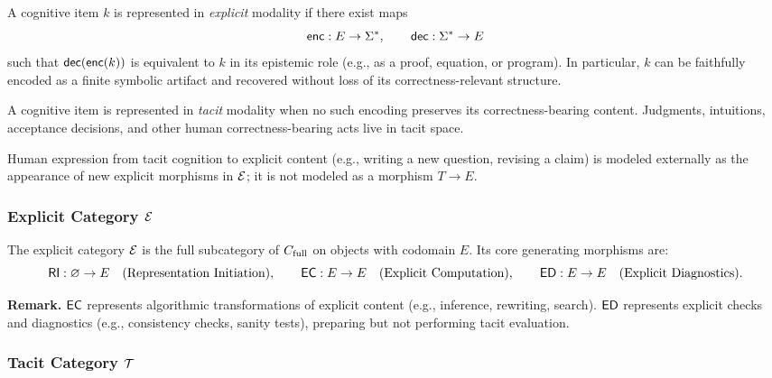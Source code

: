 \begin{definition}
A cognitive item \(k\) is represented in \emph{explicit} modality if there exist
maps
\[
\mathsf{enc} : E \to \Sigma^{\ast}, \qquad
\mathsf{dec} : \Sigma^{\ast} \to E
\]
such that \(\mathsf{dec}(\mathsf{enc}(k))\) is equivalent to \(k\) in its epistemic role
(e.g., as a proof, equation, or program). In particular, \(k\) can be
faithfully encoded as a finite symbolic artifact and recovered without
loss of its correctness-relevant structure.
\end{definition}

\begin{definition}
A cognitive item is represented in \emph{tacit} modality when no such
encoding preserves its correctness-bearing content. Judgments, intuitions,
acceptance decisions, and other human correctness-bearing acts live in
tacit space.
\end{definition}

Human expression from tacit cognition to explicit content (e.g., writing a
new question, revising a claim) is modeled externally as the appearance of
new explicit morphisms in \(\mathcal{E}\); it is not modeled as a morphism
\(T \to E\).

\subsubsection{Explicit Category \texorpdfstring{\(\mathcal{E}\)}{E}}

\begin{definition}
The explicit category \(\mathcal{E}\) is the full subcategory of \(C_{\mathrm{full}}\)
on objects with codomain \(E\). Its core generating morphisms are:
\[
\mathsf{RI} : \varnothing \to E
\quad\text{(Representation Initiation)},\qquad
\mathsf{EC} : E \to E
\quad\text{(Explicit Computation)},\qquad
\mathsf{ED} : E \to E
\quad\text{(Explicit Diagnostics)}.
\]
\end{definition}

\noindent
\textbf{Remark.}
\(\mathsf{EC}\) represents algorithmic transformations of explicit content
(e.g., inference, rewriting, search). \(\mathsf{ED}\) represents explicit
checks and diagnostics (e.g., consistency checks, sanity tests),
preparing but not performing tacit evaluation.

\subsubsection{Tacit Category \texorpdfstring{\(\mathcal{T}\)}{T}}

